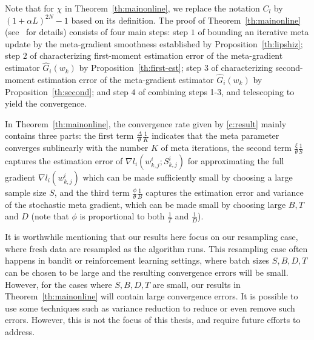 \documentclass{osudissert96}
\begin{document}
Note that for $\chi$ in Theorem~\ref{th:mainonline}, we replace the notation $C_{l}$ by $(1+\alpha L)^{2N} - 1$ based on its definition.  
The proof of Theorem~\ref{th:mainonline} (see~ for details) consists of four main steps: step $1$ of bounding an iterative meta update by the meta-gradient smoothness established by Proposition~\ref{th:lipshiz}; step $2$ of characterizing first-moment estimation error of the meta-gradient estimator $\widehat G_i(w_k)$ by Proposition~\ref{th:first-est}; step $3$ of characterizing second-moment estimation error of the meta-gradient estimator $\widehat G_i(w_k)$ by Proposition~\ref{th:second}; and step $4$ of combining steps 1-3, and telescoping to yield the convergence. 

In Theorem~\ref{th:mainonline}, the convergence rate given by  \cref{c:result}  mainly contains three parts:
the first term $\frac{\Delta}{\theta }\frac{1}{K}$ indicates that the meta parameter converges sublinearly with the number $K$ of meta iterations, 
 the second term $ \frac{\xi}{\theta}\frac{1}{S}$ captures the estimation error of $\nabla l_i(w^i_{k,j};S^i_{k,j})$ for approximating the full gradient $\nabla l_i(w^i_{k,j})$ which can be made sufficiently small by choosing a large sample size $S$,   
 and the third term $\frac{\phi }{\theta}\frac{1}{B}$ captures the estimation error and variance of the stochastic meta gradient, 
 which can be made small by choosing large $B,T$ and $D$
  (note that $\phi$ is proportional to both $\frac{1}{T}$ and $\frac{1}{D}$).

It is worthwhile mentioning that our results here focus on our resampling case, where fresh data are resampled as the algorithm runs. This resampling case often happens in bandit or reinforcement learning settings, where batch sizes $S,B,D,T$ can be chosen to be large and the resulting convergence errors will be small. However, for the cases where $S,B,D,T$ are small, our results in Theorem~\ref{th:mainonline} will contain large convergence errors. It is possible to use some techniques such as variance reduction to reduce or even remove such errors. However, this is not the focus of this thesis, and require future efforts to address. 
\end{document}
